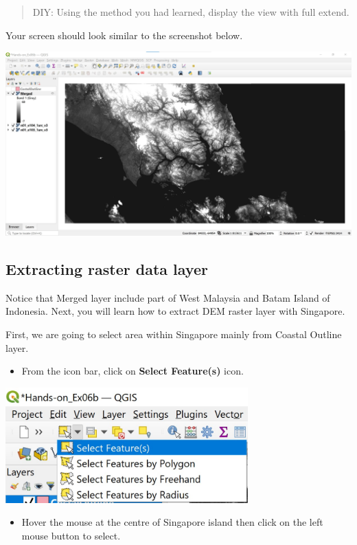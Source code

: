 \documentclass[
  letterpaper,
  DIV=11,
  numbers=noendperiod]{scrreprt}
\providecommand{\tightlist}{%
  \setlength{\itemsep}{0pt}\setlength{\parskip}{0pt}}\usepackage{longtable,booktabs,array}
\begin{document}
\begin{quote}
DIY: Using the method you had learned, display the view with full
extend.
\end{quote}

Your screen should look similar to the screenshot below.

\includegraphics{./img06/image47.jpg}

\hypertarget{extracting-raster-data-layer}{%
\subsection{Extracting raster data
layer}\label{extracting-raster-data-layer}}

Notice that Merged layer include part of West Malaysia and Batam Island
of Indonesia. Next, you will learn how to extract DEM raster layer with
Singapore.

First, we are going to select area within Singapore mainly from Coastal
Outline layer.

\begin{itemize}
\tightlist
\item
  From the icon bar, click on \textbf{Select Feature(s)} icon.
\end{itemize}

\includegraphics[width=3.67708in,height=\textheight]{./img06/image48.jpg}

\begin{itemize}
\tightlist
\item
  Hover the mouse at the centre of Singapore island then click on the
  left mouse button to select.
\end{itemize}
\end{document}
